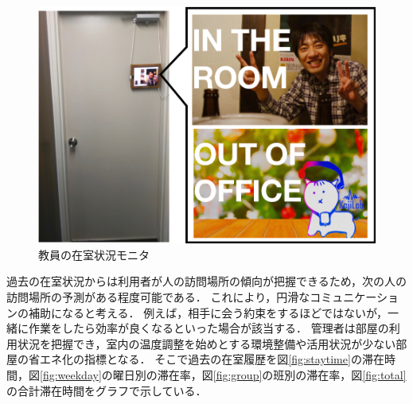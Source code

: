 \begin{figure}[H]
  \begin{center}
    \includegraphics[width=150mm]{image/OccupancyMonitor.png}
    \caption{教員の在室状況モニタ}
    \label{fig:monitor}
  \end{center}
\end{figure}

過去の在室状況からは利用者が人の訪問場所の傾向が把握できるため，次の人の訪問場所の予測がある程度可能である．
これにより，円滑なコミュニケーションの補助になると考える．
例えば，相手に会う約束をするほどではないが，一緒に作業をしたら効率が良くなるといった場合が該当する．
管理者は部屋の利用状況を把握でき，室内の温度調整を始めとする環境整備や活用状況が少ない部屋の省エネ化の指標となる．
そこで過去の在室履歴を図\ref{fig:staytime}の滞在時間，図\ref{fig:weekday}の曜日別の滞在率，図\ref{fig:group}の班別の滞在率，図\ref{fig:total}の合計滞在時間をグラフで示している．



